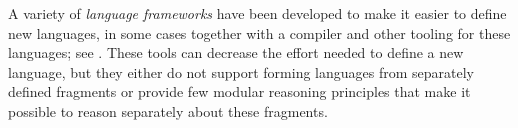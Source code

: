 \documentclass[10pt,preprint]{sigplanconf}
\begin{document}




A variety of \emph{language frameworks} have been developed to make it easier to define new languages, in some cases together with a compiler and other tooling for these languages; see \cite{erdweg2013state}. %
These tools can decrease the effort needed to define a new language, but they either do not support forming languages from separately defined fragments or provide few modular reasoning principles that make it possible to reason separately about these fragments. %
\end{document}
